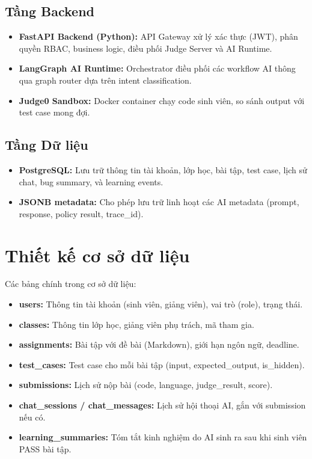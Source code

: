 \subsection{Tầng Backend}

\begin{itemize}
    \item \textbf{FastAPI Backend (Python):} API Gateway xử lý xác thực (JWT), phân quyền RBAC, business logic, điều phối Judge Server và AI Runtime.
    \item \textbf{LangGraph AI Runtime:} Orchestrator điều phối các workflow AI thông qua graph router dựa trên intent classification.
    \item \textbf{Judge0 Sandbox:} Docker container chạy code sinh viên, so sánh output với test case mong đợi.
\end{itemize}

\subsection{Tầng Dữ liệu}

\begin{itemize}
    \item \textbf{PostgreSQL:} Lưu trữ thông tin tài khoản, lớp học, bài tập, test case, lịch sử chat, bug summary, và learning events.
    \item \textbf{JSONB metadata:} Cho phép lưu trữ linh hoạt các AI metadata (prompt, response, policy result, trace\_id).
\end{itemize}

\section{Thiết kế cơ sở dữ liệu}


Các bảng chính trong cơ sở dữ liệu:

\begin{itemize}
    \item \textbf{users:} Thông tin tài khoản (sinh viên, giảng viên), vai trò (role), trạng thái.
    \item \textbf{classes:} Thông tin lớp học, giảng viên phụ trách, mã tham gia.
    \item \textbf{assignments:} Bài tập với đề bài (Markdown), giới hạn ngôn ngữ, deadline.
    \item \textbf{test\_cases:} Test case cho mỗi bài tập (input, expected\_output, is\_hidden).
    \item \textbf{submissions:} Lịch sử nộp bài (code, language, judge\_result, score).
    \item \textbf{chat\_sessions / chat\_messages:} Lịch sử hội thoại AI, gắn với submission nếu có.
    \item \textbf{learning\_summaries:} Tóm tắt kinh nghiệm do AI sinh ra sau khi sinh viên PASS bài tập.
\end{itemize}

